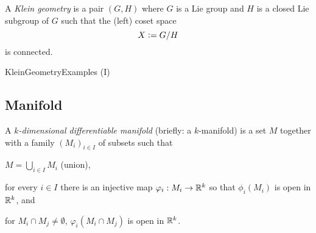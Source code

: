 \documentclass[stu, babel, american, biblatex, a4paper, leqno, draftall]{apa7}
\begin{document}
\begin{definition}\label{KleinGeometry}
    A \textit{Klein geometry} is a pair $\left(G, H\right)$
    where $G$ is a Lie group
    and $H$ is a closed Lie subgroup of $G$
    such that the (left) coset space $$X\vcentcolon= G / H$$ is connected.
\end{definition}
\begin{example}\label{KleinGeometryExample}
    KleinGeometryExamples (I)
\end{example}

\subsection{Manifold}

\begin{definition}\label{Manifold}
    A \textit{$k$-dimensional differentiable manifold} (briefly: a $k$-manifold)
    is a set $M$ together with a family $\left(M_i\right)_{i\in I}$ of subsets such that
    \begin{APAenumerate}
        \item $M=\bigcup_{i\in I} M_i$ (union),
        \item for every $i\in I$ there is an injective map $\varphi_i:M_i\to\mathbb{R}^k$ so that $\phi_i\left(M_i\right)$ is open in $\mathbb{R}^k$, and
        \item for $M_i\cap M_j\ne\emptyset$, $\varphi_i\left(M_i\cap M_j\right)$ is open in $\mathbb{R}^k$.
    \end{APAenumerate}
\end{definition}
\end{document}
